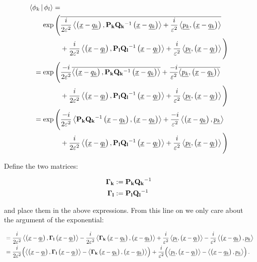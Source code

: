 \begin{align*}
  \Braket{\phi_k|\phi_l} = & \\
  \exp\Bigg( &
      \conj{\frac{i}{2\varepsilon^2} \dotp{\ofs{\vec{x}-\vec{q_k}}}{\mat{P_k} \mat{Q_k}\inv \ofs{\vec{x}-\vec{q_k}}}
      + \frac{i}{\varepsilon^2} \dotp{\vec{p_k}}{\ofs{\vec{x}-\vec{q_k}}}}
      \\
    & + \frac{i}{2\varepsilon^2} \dotp{\ofs{\vec{x}-\vec{q_l}}}{\mat{P_l} \mat{Q_l}\inv \ofs{\vec{x}-\vec{q_l}}}
      + \frac{i}{\varepsilon^2} \dotp{\vec{p_l}}{\ofs{\vec{x}-\vec{q_l}}}
  \Bigg) \\
  = \exp\Bigg( &
      \frac{-i}{2\varepsilon^2} \conj{\dotp{\ofs{\vec{x}-\vec{q_k}}}{\mat{P_k} \mat{Q_k}\inv \ofs{\vec{x}-\vec{q_k}}}}
      + \frac{-i}{\varepsilon^2} \conj{\dotp{\vec{p_k}}{\ofs{\vec{x}-\vec{q_k}}}}
      \\
    & + \frac{i}{2\varepsilon^2} \dotp{\ofs{\vec{x}-\vec{q_l}}}{\mat{P_l} \mat{Q_l}\inv \ofs{\vec{x}-\vec{q_l}}}
      + \frac{i}{\varepsilon^2} \dotp{\vec{p_l}}{\ofs{\vec{x}-\vec{q_l}}}
  \Bigg) \\
  = \exp\Bigg( &
      \frac{-i}{2\varepsilon^2} \dotp{\mat{P_k} \mat{Q_k}\inv \ofs{\vec{x}-\vec{q_k}}}{\ofs{\vec{x}-\vec{q_k}}}
      + \frac{-i}{\varepsilon^2} \dotp{\ofs{\vec{x}-\vec{q_k}}}{\vec{p_k}}
      \\
    & + \frac{i}{2\varepsilon^2} \dotp{\ofs{\vec{x}-\vec{q_l}}}{\mat{P_l} \mat{Q_l}\inv \ofs{\vec{x}-\vec{q_l}}}
      + \frac{i}{\varepsilon^2} \dotp{\vec{p_l}}{\ofs{\vec{x}-\vec{q_l}}}
  \Bigg)
\end{align*}

Define the two matrices:

\begin{align*}
  \mat{\Gamma_k} & \assign \mat{P_k} \mat{Q_k}\inv \\
  \mat{\Gamma_l} & \assign \mat{P_l} \mat{Q_l}\inv
\end{align*}

and place them in the above expressions. From this line on we only care about the
argument of the exponential:

\begin{align*}
  & = \frac{i}{2\varepsilon^2} \dotp{\ofs{\vec{x}-\vec{q_l}}}{\mat{\Gamma_l} \ofs{\vec{x}-\vec{q_l}}}
    - \frac{i}{2\varepsilon^2} \dotp{\mat{\Gamma_k} \ofs{\vec{x}-\vec{q_k}}}{\ofs{\vec{x}-\vec{q_k}}}
    + \frac{i}{\varepsilon^2} \dotp{\vec{p_l}}{\ofs{\vec{x}-\vec{q_l}}}
    - \frac{i}{\varepsilon^2} \dotp{\ofs{\vec{x}-\vec{q_k}}}{\vec{p_k}} \\
  & = \frac{i}{2\varepsilon^2} \Bigl(
    \dotp{\ofs{\vec{x}-\vec{q_l}}}{\mat{\Gamma_l} \ofs{\vec{x}-\vec{q_l}}} - \dotp{\mat{\Gamma_k} \ofs{\vec{x}-\vec{q_k}}}{\ofs{\vec{x}-\vec{q_k}}}
    \Bigr) + \frac{i}{\varepsilon^2} \Bigl(
    \dotp{\vec{p_l}}{\ofs{\vec{x}-\vec{q_l}}} - \dotp{\ofs{\vec{x}-\vec{q_k}}}{\vec{p_k}}
    \Bigr) \,.
\end{align*}

